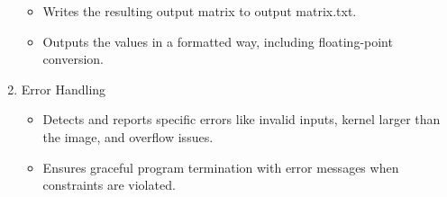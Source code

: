 \documentclass[a4paper]{article}
\begin{document}
\begin{enumerate}
	\begin{itemize}
		\item Writes the resulting output matrix to output matrix.txt.
		\item Outputs the values in a formatted way, including floating-point conversion.
	\end{itemize}
	\item Error Handling
	\begin{itemize}
		\item Detects and reports specific errors like invalid inputs, kernel larger than the
		image, and overflow issues.
		\item Ensures graceful program termination with error messages when constraints
		are violated.
	\end{itemize}
\end{enumerate}
\end{document}
